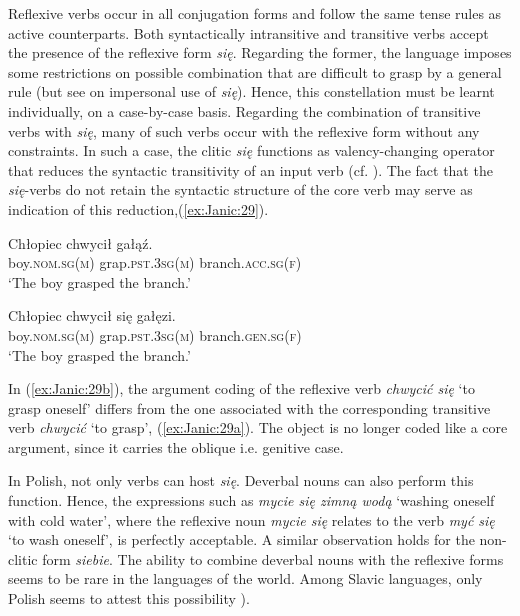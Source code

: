 \documentclass[output=paper]{langscibook}
\begin{document}
Reflexive verbs occur in all conjugation forms and follow the same tense rules as active counterparts. Both syntactically intransitive and transitive verbs accept the presence of the reflexive form \textit{się}. Regarding the former, the language imposes some restrictions on possible combination that are difficult to grasp by a general rule (but see  on impersonal use of \textit{się}). Hence, this constellation must be learnt individually, on a case-by-case basis. Regarding the combination of transitive verbs with \textit{się}, many of such verbs occur with the reflexive form without any constraints. In such a case, the clitic \textit{się} functions as valency-changing operator that reduces the syntactic transitivity of an input verb (cf. ). The fact that the \textit{się}-verbs do not retain the syntactic structure of the core verb may serve as indication of this reduction,(\ref{ex:Janic:29}).

\ea \label{ex:Janic:29}
\ea \label{ex:Janic:29a}
\gll Chłopiec			 chwycił	 gałąź.\\
	 boy.\textsc{nom.sg(m)} 	grap.\textsc{pst.3sg(m)}	branch.\textsc{acc.sg(f)}\\
\glt ‘The boy grasped the branch.’

\ex \label{ex:Janic:29b}
\gll Chłopiec		 chwycił	 się	 gałęzi.\\
	 boy.\textsc{nom.sg(m)} 	grap.\textsc{pst.3sg(m)}		branch.\textsc{gen.sg(f)}\\
\glt ‘The boy grasped the branch.’
\z 
\z 
	
In (\ref{ex:Janic:29b}), the argument coding of the reflexive verb \textit{chwycić się} ‘to grasp oneself’ differs from the one associated with the corresponding transitive verb \textit{chwycić} ‘to grasp’, (\ref{ex:Janic:29a}). The object is no longer coded like a core argument, since it carries the oblique i.e. genitive case.

In Polish, not only verbs can host \textit{się}. Deverbal nouns can also perform this function. Hence, the expressions such as \textit{mycie się zimną wodą} ‘washing oneself with cold water’, where the reflexive noun \textit{mycie się} relates to the verb \textit{myć się} ‘to wash oneself’, is perfectly acceptable. A similar observation holds for the non-clitic form \textit{siebie}. The ability to combine deverbal nouns with the reflexive forms seems to be rare in the languages of the world. Among Slavic languages, only Polish seems to attest this possibility \citep{SussexCubberley2006}).
\end{document}
